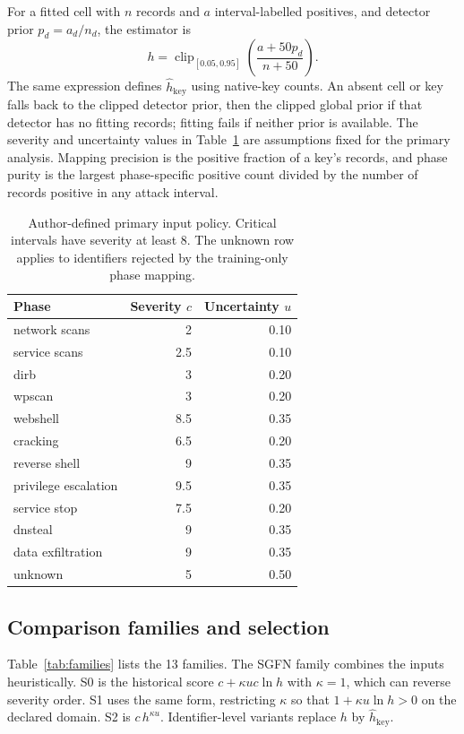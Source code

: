 \documentclass[pdflatex,sn-basic,Numbered]{sn-jnl}
\begin{document}
For a fitted cell with $n$ records and $a$ interval-labelled positives, and detector prior $p_d=a_d/n_d$, the estimator is
\begin{equation}
 h=\operatorname{clip}_{[0.05,0.95]}\!\left(\frac{a+50p_d}{n+50}\right).
\end{equation}
The same expression defines $\hat h_{\mathrm{key}}$ using native-key counts. An absent cell or key falls back to the clipped detector prior, then the clipped global prior if that detector has no fitting records; fitting fails if neither prior is available. The severity and uncertainty values in Table~\ref{tab:policy} are assumptions fixed for the primary analysis. Mapping precision is the positive fraction of a key's records, and phase purity is the largest phase-specific positive count divided by the number of records positive in any attack interval.

\begin{table}[t]
\centering
\caption{Author-defined primary input policy. Critical intervals have severity at least 8. The unknown row applies to identifiers rejected by the training-only phase mapping.}
\label{tab:policy}
\small
\begin{tabular}{lrr}
\toprule
Phase & Severity $c$ & Uncertainty $u$ \\
\midrule
network scans & 2 & 0.10 \\
service scans & 2.5 & 0.10 \\
dirb & 3 & 0.20 \\
wpscan & 3 & 0.20 \\
webshell & 8.5 & 0.35 \\
cracking & 6.5 & 0.20 \\
reverse shell & 9 & 0.35 \\
privilege escalation & 9.5 & 0.35 \\
service stop & 7.5 & 0.20 \\
dnsteal & 9 & 0.35 \\
data exfiltration & 9 & 0.35 \\
unknown & 5 & 0.50 \\
\bottomrule
\end{tabular}
\unskip
\end{table}

\subsection{Comparison families and selection}

Table~\ref{tab:families} lists the 13 families. The SGFN family combines the inputs heuristically. S0 is the historical score $c + \kappa u c \ln h$ with $\kappa=1$, which can reverse severity order. S1 uses the same form, restricting $\kappa$ so that $1 + \kappa u \ln h > 0$ on the declared domain. S2 is $c\,h^{\kappa u}$. Identifier-level variants replace $h$ by $\hat h_{\mathrm{key}}$.
\end{document}
